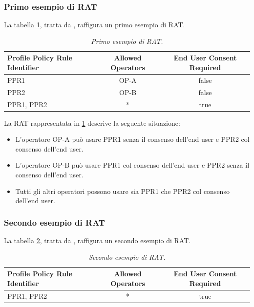 \documentclass[10pt, oneside]{book}
\begin{document}
\subsubsection{Primo esempio di RAT}
La tabella \ref{tab:rat1}, tratta da \cite{GSMA-docs-new}, raffigura un primo esempio di RAT.\\
\begin{table}[h!]
\begin{center}
\captionsetup{skip=4pt}
\caption{\textit{Primo esempio di RAT.}}
\label{tab:rat1}
\begin{tabularx}{\textwidth}{|X|c|c|} %
\hline
\textbf{Profile Policy Rule Identifier} & \textbf{Allowed Operators} & \textbf{End User Consent Required}\\
\hline
PPR1 & OP-A & false\\
\hline
PPR2 & OP-B & false\\
\hline
PPR1, PPR2 & * & true\\
\hline
\end{tabularx}
\end{center}
\end{table}

La RAT rappresentata in \ref{tab:rat1} descrive la seguente situazione:
\begin{itemize}
\item L'operatore OP-A può usare PPR1 senza il consenso dell'end user e PPR2 col consenso dell'end user.
\item L'operatore OP-B può usare PPR1 col consenso dell'end user e PPR2 senza il consenso dell'end user.
\item Tutti gli altri operatori possono usare sia PPR1 che PPR2 col consenso dell'end user.
\end{itemize}

\subsubsection{Secondo esempio di RAT}
La tabella \ref{tab:rat2}, tratta da \cite{GSMA-docs-new}, raffigura un secondo esempio di RAT.\\
\begin{table}[h!]
\begin{center}
\captionsetup{skip=4pt}
\caption{\textit{Secondo esempio di RAT.}}
\label{tab:rat2}
\begin{tabularx}{\textwidth}{|X|c|c|} %
\hline
\textbf{Profile Policy Rule Identifier} & \textbf{Allowed Operators} & \textbf{End User Consent Required}\\
\hline
PPR1, PPR2 & * & true\\
\hline
\end{tabularx}
\end{center}
\end{table}
\end{document}
